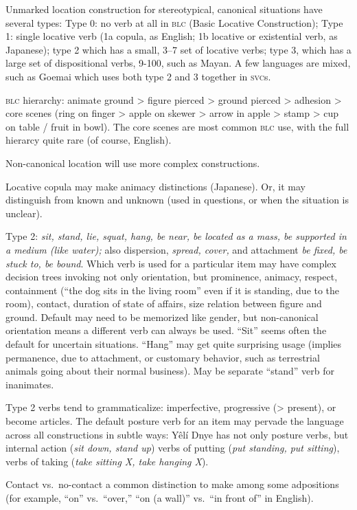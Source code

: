 \documentclass[11pt]{article}
\newcommand{\I}[1]{\textsc{#1}}   %
\begin{document}
{Unmarked location construction for stereotypical, canonical situations
have several types: Type 0: no verb at all in \I{blc} (Basic Locative
Construction); Type 1: single locative verb (1a copula, as English; 1b
locative or existential verb, as Japanese); type 2 which has a small,
3--7 set of locative verbs; type 3, which has a large set of
dispositional verbs, 9-100, such as Mayan.  A few languages are mixed,
such as Goemai which uses both type 2 and 3 together in \I{svc}s.

\I{blc} hierarchy: animate ground > figure pierced > ground pierced >
adhesion > core scenes (ring on finger > apple on skewer > arrow in
apple > stamp > cup on table / fruit in bowl).  The core scenes are
most common \I{blc} use, with the full hierarcy quite rare (of course,
English).

Non-canonical location will use more complex constructions.  

Locative copula may make animacy distinctions (Japanese).  Or, it may
distinguish from known and unknown (used in questions, or when the
situation is unclear).

Type 2: \textit{sit, stand, lie, squat, hang, be near, be located as a
mass, be supported in a medium (like water);} also dispersion,
\textit{spread, cover,} and attachment \textit{be fixed, be stuck to,
be bound}.  Which verb is used for a particular item may have
complex decision trees invoking not only orientation, but
prominence, animacy, respect, containment (``the dog sits in the
living room'' even if it is standing, due to the room), contact,
duration of state of affairs, size relation between figure and ground.
Default may need to be memorized like gender, but non-canonical
orientation means a different verb can always be used.  ``Sit'' seems
often the default for uncertain situations.  ``Hang'' may get quite
surprising usage (implies permanence, due to attachment, or customary
behavior, such as terrestrial animals going about their normal
business).  May be separate ``stand'' verb for inanimates.

Type 2 verbs tend to grammaticalize: imperfective, progressive (>
present), or become articles.  The default posture verb for an item
may pervade the language across all constructions in subtle ways: Yêlí
Dnye has not only posture verbs, but internal action (\textit{sit
down, stand up}) verbs of putting (\textit{put standing, put
sitting}), verbs of taking (\textit{take sitting X, take hanging
X}).

Contact vs.\ no-contact a common distinction to make among some
adpositions (for example, ``on'' vs.\ ``over,'' ``on (a wall)''
vs.\ ``in front of'' in English).


}
\end{document}
